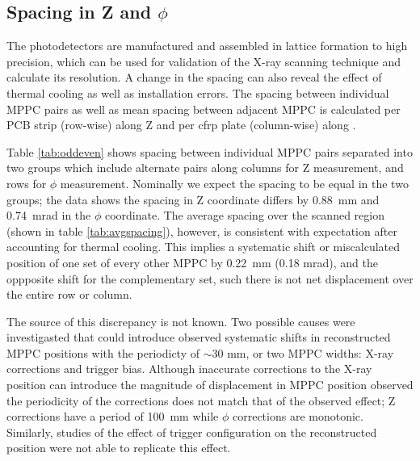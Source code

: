 \subsection{Spacing in Z and $\phi$}
The photodetectors are manufactured and assembled in lattice formation
to high precision, which can be used for validation of the X-ray
scanning technique and calculate its resolution.  A change in the
spacing can also reveal the effect of thermal cooling as well as
installation errors.  The spacing between individual MPPC pairs as
well as mean spacing between adjacent MPPC is calculated per PCB strip
(row-wise) along Z and per cfrp plate (column-wise) along \phis. 

Table \ref{tab:oddeven} shows spacing between individual MPPC pairs separated
into two groups which include alternate pairs along columns for Z measurement,
and rows for $\phi$ measurement.  Nominally we expect the spacing to be equal in
the two groups; the data shows the spacing in Z coordinate differs by 0.88~mm
and 0.74~mrad in the $\phi$ coordinate.  The average spacing over the scanned
region (shown in table \ref{tab:avgspacing}), however, is consistent with
expectation after accounting for thermal cooling.  
This implies a systematic shift or miscalculated position 
of one set of every other MPPC by 0.22~mm (0.18 mrad), and the oppposite 
shift for the complementary set, such there is not net displacement over the entire
row or column. 

The source of this discrepancy is not known.
Two possible causes were investigasted that could introduce observed 
systematic shifts in reconstructed MPPC positions with the periodicty of 
$\sim$30 mm, or two MPPC widths: X-ray corrections and trigger bias.
Although inaccurate corrections to the X-ray position can introduce the magnitude of 
displacement in MPPC position observed the periodicity of the corrections
does not match that of the observed effect; Z corrections have a period of 
100~mm while $\phi$ corrections are monotonic.
Similarly, studies of the effect of trigger configuration on the reconstructed position 
were not able to replicate this effect. 

